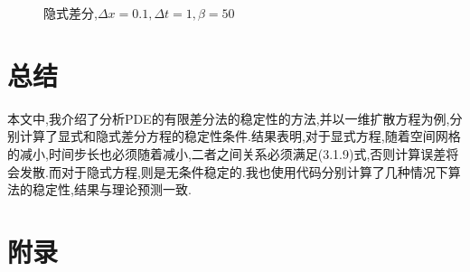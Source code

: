 \documentclass{article}
\numberwithin{equation}{subsection}
\begin{document}
\begin{figure}[H]
\centering
{}
\quad
{}
\quad
{}
\quad
{}
\caption{隐式差分,$\Delta x = 0.1,\Delta t = 1,\beta = 50$}
\end{figure}

\section{总结}
本文中,我介绍了分析PDE的有限差分法的稳定性的方法,并以一维扩散方程为例,分别计算了显式和隐式差分方程的稳定性条件.结果表明,对于显式方程,随着空间网格的减小,时间步长也必须随着减小,二者之间关系必须满足(3.1.9)式,否则计算误差将会发散.而对于隐式方程,则是无条件稳定的.我也使用代码分别计算了几种情况下算法的稳定性,结果与理论预测一致.
\section{附录}


\clearpage
\small{


}
\end{document}
